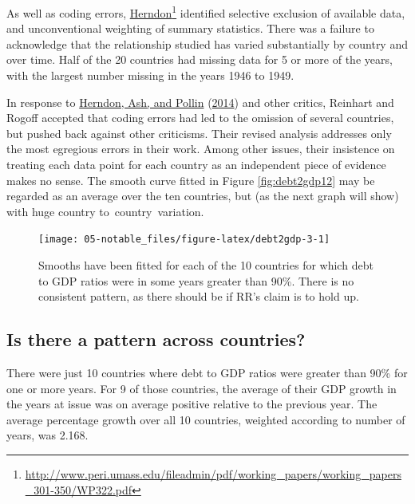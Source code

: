 \documentclass[
  10pt,
  b5paper]{book}
\begin{document}
As well as coding errors,
\href{http://www.peri.umass.edu/fileadmin/pdf/working_papers/working_papers_301-350/WP322.pdf}{Herndon}\footnote{\url{http://www.peri.umass.edu/fileadmin/pdf/working_papers/working_papers_301-350/WP322.pdf}} identified selective exclusion of available data,
and unconventional weighting of summary statistics. There was a
failure to acknowledge that the relationship studied has varied
substantially by country and over time. Half of the 20 countries
had missing data for 5 or more of the years, with the largest
number missing in the years 1946 to 1949.

In response to \protect\hyperlink{ref-herndon2014does}{Herndon, Ash, and Pollin} (\protect\hyperlink{ref-herndon2014does}{2014}) and other critics, Reinhart and
Rogoff accepted that coding errors had led to the omission of
several countries, but pushed back against other criticisms.
Their revised analysis addresses only the most egregious errors
in their work. Among other issues, their insistence on treating
each data point for each country as an independent piece of
evidence makes no sense. The smooth curve fitted in Figure
\ref{fig:debt2gdp12} may be regarded as an average over the
ten countries, but (as the next graph will show) with huge country
to~country~variation.

\begin{figure}[H]

{\centering \texttt{[image: 05-notable\_files/figure-latex/debt2gdp-3-1]} 

}

\caption{Smooths have been fitted for each of the 10 countries
for which debt to GDP ratios were in some years greater than 90\%.
There is no consistent pattern, as there should be if RR's claim
is to hold up.}\label{fig:debt2gdp-3}
\end{figure}

\hypertarget{is-there-a-pattern-across-countries}{%
\subsection*{Is there a pattern across countries?}\label{is-there-a-pattern-across-countries}}

There were just 10 countries where debt to GDP ratios were
greater than 90\% for one or more years. For 9 of
those countries, the average of their GDP growth in the years at issue
was on average positive relative to the previous year. The average
percentage growth over all 10 countries, weighted according
to number of years, was 2.168.
\end{document}
